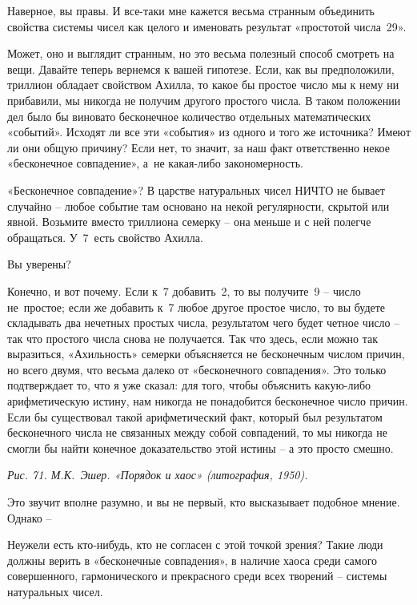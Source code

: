 \documentclass[../main.tex]{subfiles}
\begin{document}
\begin{dialogue}
 Наверное, вы правы. И все-таки мне кажется весьма странным объединить свойства системы чисел как целого и именовать результат «простотой числа~29».

 Может, оно и выглядит странным, но это весьма полезный способ смотреть на вещи. Давайте теперь вернемся к вашей гипотезе. Если, как вы предположили, триллион обладает свойством Ахилла, то какое бы простое число мы к нему ни прибавили, мы никогда не получим другого простого числа. В таком положении дел было бы виновато бесконечное количество отдельных математических «событий». Исходят ли все эти «события» из одного и того же источника? Имеют ли они общую причину? Если нет, то значит, за наш факт ответственно некое «бесконечное совпадение», а~не какая-либо закономерность.

 «Бесконечное совпадение»? В царстве натуральных чисел НИЧТО не бывает случайно \--- любое событие там основано на некой регулярности, скрытой или явной. Возьмите вместо триллиона семерку \--- она меньше и с ней полегче обращаться. У~7~есть свойство Ахилла.

 Вы уверены?

 Конечно, и вот почему. Если к~7 добавить~2, то вы получите~9 \--- число не~простое; если же добавить к~7 любое другое простое число, то вы будете складывать два нечетных простых числа, результатом чего будет четное число \--- так что простого числа снова не получается. Так что здесь, если можно так выразиться, «Ахильность» семерки объясняется не бесконечным числом причин, но всего двумя, что весьма далеко от «бесконечного совпадения». Это только подтверждает то, что я уже сказал: для того, чтобы объяснить какую-либо арифметическую истину, нам никогда не понадобится бесконечное число причин. Если бы существовал такой арифметический факт, который был результатом бесконечного числа не связанных между собой совпадений, то мы никогда не смогли бы найти конечное доказательство этой истины \--- а это просто смешно.

\emph{Рис. 71. М.К.~Эшер. «Порядок и хаос» (литография, 1950).}

 Это звучит вполне разумно, и вы не первый, кто высказывает подобное мнение. Однако \---

 Неужели есть кто-нибудь, кто не согласен с этой точкой зрения? Такие люди должны верить в «бесконечные совпадения», в наличие хаоса среди самого совершенного, гармонического и прекрасного среди всех творений \--- системы натуральных чисел.


\end{dialogue}
\end{document}
